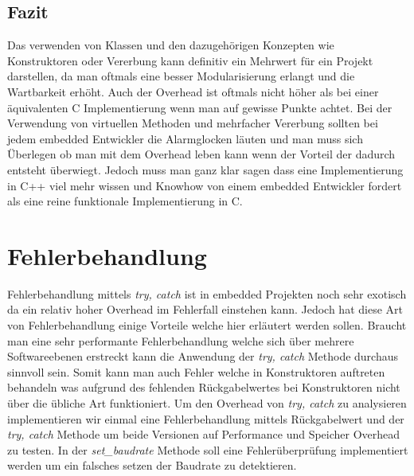 \documentclass[MES,Master,ngerman]{twbook}%
\begin{document}
\subsection{Fazit}
Das verwenden von Klassen und den dazugehörigen Konzepten wie Konstruktoren oder Vererbung kann definitiv ein Mehrwert für ein Projekt darstellen, da man oftmals eine besser Modularisierung erlangt und die Wartbarkeit erhöht. Auch der Overhead ist oftmals nicht höher als bei einer äquivalenten C Implementierung wenn man auf gewisse Punkte achtet. Bei der Verwendung von virtuellen Methoden und mehrfacher Vererbung sollten bei jedem embedded Entwickler die Alarmglocken läuten und man muss sich Überlegen ob man mit dem Overhead leben kann wenn der Vorteil der dadurch entsteht überwiegt. Jedoch muss man ganz klar sagen dass eine Implementierung in C++ viel mehr wissen und Knowhow von einem embedded Entwickler fordert als eine reine funktionale Implementierung in C.

\newpage


\section{Fehlerbehandlung}
Fehlerbehandlung mittels \textit{try, catch} ist in embedded Projekten noch sehr exotisch da ein relativ hoher Overhead im Fehlerfall einstehen kann. Jedoch hat diese Art von Fehlerbehandlung einige Vorteile welche hier erläutert werden sollen. Braucht man eine sehr performante Fehlerbehandlung welche sich über mehrere Softwareebenen erstreckt kann die Anwendung der \textit{try, catch} Methode durchaus sinnvoll sein. Somit kann man auch Fehler welche in Konstruktoren auftreten behandeln was aufgrund des fehlenden Rückgabelwertes bei Konstruktoren nicht über die übliche Art funktioniert. \newline\newline Um den Overhead von \textit{try, catch} zu analysieren implementieren wir einmal eine Fehlerbehandlung mittels Rückgabelwert und der \textit{try, catch} Methode um beide Versionen auf Performance und Speicher Overhead zu testen. In der \textit{set\_baudrate} Methode soll eine Fehlerüberprüfung implementiert werden um ein falsches setzen der Baudrate zu detektieren. 

\begin{figure}[!htb]
	\begin{subfigure}[b]{0.5\textwidth}
		
		\label{fig:38}
	\end{subfigure}
	\begin{subfigure}[b]{0.5\textwidth}
		
		\label{fig:39}
	\end{subfigure}
\end{figure}
\end{document}
